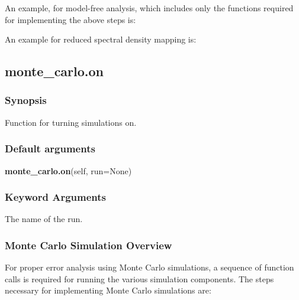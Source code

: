 An example, for model-free analysis, which includes only the functions required for
implementing the above steps is:




An example for reduced spectral density mapping is:





\newpage

\subsection{monte\_carlo.on}


\subsubsection{Synopsis}

Function for turning simulations on.

\subsubsection{Default arguments}

\textsf{\textbf{monte\_carlo.on}(self, run=None)}


\subsubsection{Keyword Arguments}

  The name of the run.

\subsubsection{Monte Carlo Simulation Overview}

For proper error analysis using Monte Carlo simulations, a sequence of function calls is
required for running the various simulation components.  The steps necessary for
implementing Monte Carlo simulations are:

